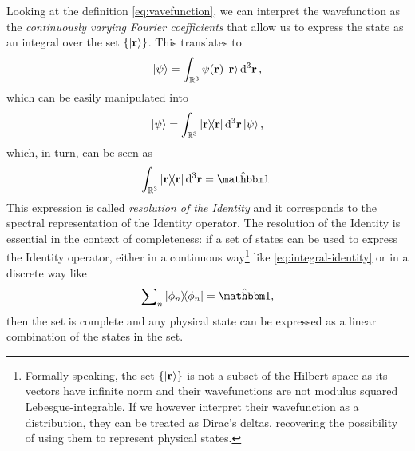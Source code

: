             Looking at the definition \eqref{eq:vavefunction}, we can interpret the wavefunction as the \emph{continuously varying Fourier coefficients} that allow us to express the state as an integral over the set $\qty{\ket{\vb{r}}}$. This translates to
            \begin{equation*}
                \ket{\psi} = \int\nolimits_{\bbR^3} \psi\pqty{\vb{r}} \ket{\vb{r}} \dd[3]{\vb{r}}
                \mycomma
            \end{equation*}
            which can be easily manipulated into
            \begin{equation*}
                \ket{\psi} = \int\nolimits_{\bbR^3} \dyad{\vb{r}}{\vb{r}} \dd[3]{\vb{r}} \ket{\psi}
                \mycomma
            \end{equation*}
            which, in turn, can be seen as
            \begin{equation}
                \label{eq:integral-identity}
                \int\nolimits_{\bbR^3} \dyad{\vb{r}}{\vb{r}} \dd[3]{\vb{r}} = \hidM
                \myperiod
            \end{equation}
            This expression is called \emph{resolution of the Identity} and it corresponds to the spectral representation of the Identity operator. The resolution of the Identity is essential in the context of completeness: if a set of states can be used to express the Identity operator, either in a continuous way\footnote{Formally speaking, the set $\qty{\ket{\vb{r}}}$ is not a subset of the Hilbert space as its vectors have infinite norm and their wavefunctions are not modulus squared Lebesgue-integrable. If we however interpret their wavefunction as a distribution, they can be treated as Dirac's deltas, recovering the possibility of using them to represent physical states.} like \eqref{eq:integral-identity} or in a discrete way like
            \begin{equation*}
                \sum\nolimits_n \dyad{\phi_n}{\phi_n} = \hidM
                \mycomma
            \end{equation*}
            then the set is complete and any physical state can be expressed as a linear combination of the states in the set.
        
